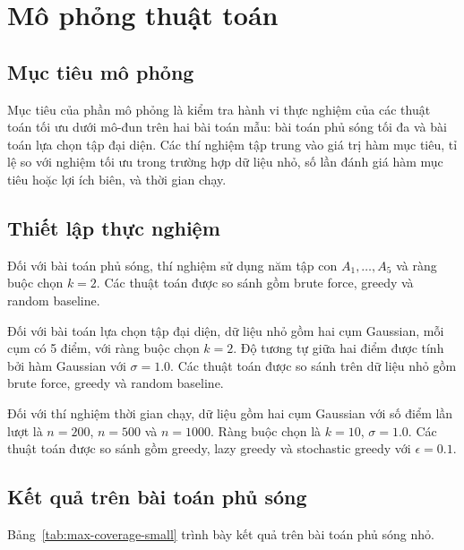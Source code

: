 \section{Mô phỏng thuật toán}

\subsection{Mục tiêu mô phỏng}

Mục tiêu của phần mô phỏng là kiểm tra hành vi thực nghiệm của các thuật toán tối ưu dưới mô-đun trên hai bài toán mẫu: bài toán phủ sóng tối đa và bài toán lựa chọn tập đại diện. Các thí nghiệm tập trung vào giá trị hàm mục tiêu, tỉ lệ so với nghiệm tối ưu trong trường hợp dữ liệu nhỏ, số lần đánh giá hàm mục tiêu hoặc lợi ích biên, và thời gian chạy.

\subsection{Thiết lập thực nghiệm}

Đối với bài toán phủ sóng, thí nghiệm sử dụng năm tập con \(A_1,\ldots,A_5\) và ràng buộc chọn \(k=2\). Các thuật toán được so sánh gồm brute force, greedy và random baseline.

Đối với bài toán lựa chọn tập đại diện, dữ liệu nhỏ gồm hai cụm Gaussian, mỗi cụm có 5 điểm, với ràng buộc chọn \(k=2\). Độ tương tự giữa hai điểm được tính bởi hàm Gaussian với \(\sigma=1.0\). Các thuật toán được so sánh trên dữ liệu nhỏ gồm brute force, greedy và random baseline.

Đối với thí nghiệm thời gian chạy, dữ liệu gồm hai cụm Gaussian với số điểm lần lượt là \(n=200\), \(n=500\) và \(n=1000\). Ràng buộc chọn là \(k=10\), \(\sigma=1.0\). Các thuật toán được so sánh gồm greedy, lazy greedy và stochastic greedy với \(\epsilon=0.1\).

\subsection{Kết quả trên bài toán phủ sóng}

Bảng~\ref{tab:max-coverage-small} trình bày kết quả trên bài toán phủ sóng nhỏ.

\begin{table}[ht]
    \centering
    \caption{Kết quả mô phỏng trên bài toán phủ sóng nhỏ}
    \label{tab:max-coverage-small}
    
\end{table}

